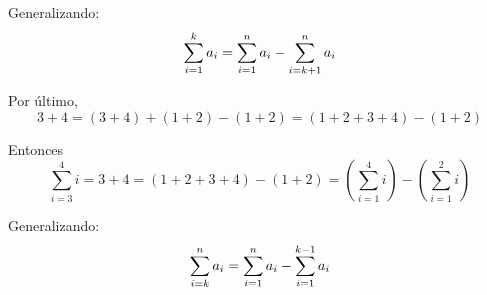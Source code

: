 Generalizando:
\begin{equation*}
\sum_{i=1}^k{a_i} = \sum_{i=1}^n{a_i} - \sum_{i=k+1}^n{a_i}
\end{equation*}


Por último,
\begin{equation*}
3+4 = (3+4) + (1+2) - (1+2) = (1+2+3+4) - (1+2)
\end{equation*}

Entonces
\begin{equation*}
\sum_{i=3}^4{i} = 3+4 = (1+2+3+4) - (1+2) = (\sum_{i=1}^4{i}) - (\sum_{i=1}^2{i})
\end{equation*}

Generalizando:
\begin{equation*}
\sum_{i=k}^n{a_i} = \sum_{i=1}^n{a_i} - \sum_{i=1}^{k-1}{a_i}
\end{equation*}


